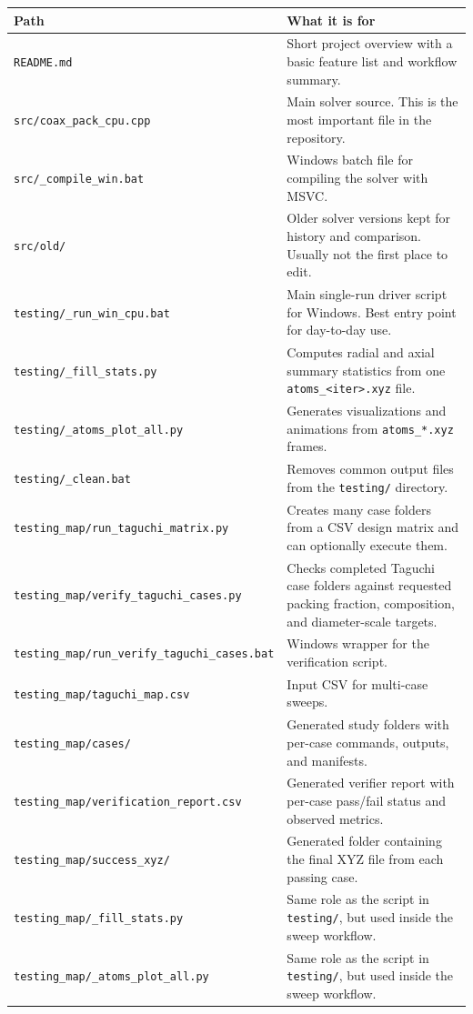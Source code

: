 \documentclass[11pt]{article}
\begin{document}
\begin{longtable}{p{}p{}}
\toprule
\textbf{Path} & \textbf{What it is for} \\
\midrule
\endhead
\texttt{README.md} & Short project overview with a basic feature list and workflow summary. \\
\texttt{src/coax\_pack\_cpu.cpp} & Main solver source. This is the most important file in the repository. \\
\texttt{src/\_compile\_win.bat} & Windows batch file for compiling the solver with MSVC. \\
\texttt{src/old/} & Older solver versions kept for history and comparison. Usually not the first place to edit. \\
\texttt{testing/\_run\_win\_cpu.bat} & Main single-run driver script for Windows. Best entry point for day-to-day use. \\
\texttt{testing/\_fill\_stats.py} & Computes radial and axial summary statistics from one \texttt{atoms\_<iter>.xyz} file. \\
\texttt{testing/\_atoms\_plot\_all.py} & Generates visualizations and animations from \texttt{atoms\_*.xyz} frames. \\
\texttt{testing/\_clean.bat} & Removes common output files from the \texttt{testing/} directory. \\
\texttt{testing\_map/run\_taguchi\_matrix.py} & Creates many case folders from a CSV design matrix and can optionally execute them. \\
\texttt{testing\_map/verify\_taguchi\_cases.py} & Checks completed Taguchi case folders against requested packing fraction, composition, and diameter-scale targets. \\
\texttt{testing\_map/run\_verify\_taguchi\_cases.bat} & Windows wrapper for the verification script. \\
\texttt{testing\_map/taguchi\_map.csv} & Input CSV for multi-case sweeps. \\
\texttt{testing\_map/cases/} & Generated study folders with per-case commands, outputs, and manifests. \\
\texttt{testing\_map/verification\_report.csv} & Generated verifier report with per-case pass/fail status and observed metrics. \\
\texttt{testing\_map/success\_xyz/} & Generated folder containing the final XYZ file from each passing case. \\
\texttt{testing\_map/\_fill\_stats.py} & Same role as the script in \texttt{testing/}, but used inside the sweep workflow. \\
\texttt{testing\_map/\_atoms\_plot\_all.py} & Same role as the script in \texttt{testing/}, but used inside the sweep workflow. \\
\bottomrule
\end{longtable}
\end{document}

